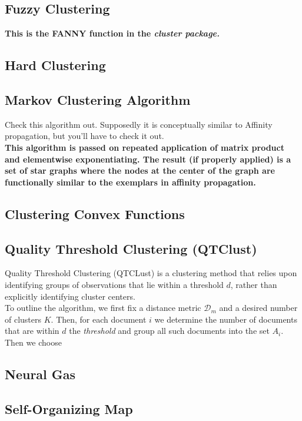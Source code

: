 \documentclass[11pt,letterpaper]{article}
\numberwithin{equation}{section}
\begin{document}
\subsection{Fuzzy Clustering}
\textbf{This is the FANNY function in the \emph{cluster package.}  }

\subsection{Hard Clustering}

\subsection{Markov Clustering Algorithm}
Check this algorithm out.  Supposedly it is conceptually similar to
Affinity propagation, but you'll have to check it out. \\
\textbf{This algorithm is passed on repeated application of matrix
product and elementwise exponentiating.  The result (if properly
applied) is a set of star graphs where the nodes at the center of
the graph are functionally similar to the exemplars in affinity
propagation.  }

\subsection{Clustering Convex Functions}

\subsection{Quality Threshold Clustering (QTClust)}
Quality Threshold Clustering (QTCLust) is a clustering method that
relies upon identifying groups of observations that lie within a
threshold $d$, rather than explicitly identifying cluster centers.
\\
\indent To outline the algorithm, we first fix a distance metric
$\mathcal{D}_m$ and a desired number of clusters $K$.  Then, for
each document $i$ we determine the number of documents that are
within $d$ the \emph{threshold} and group all such documents into
the set $A_i$. Then we choose


\subsection{Neural Gas}

\subsection{Self-Organizing Map}
\end{document}
